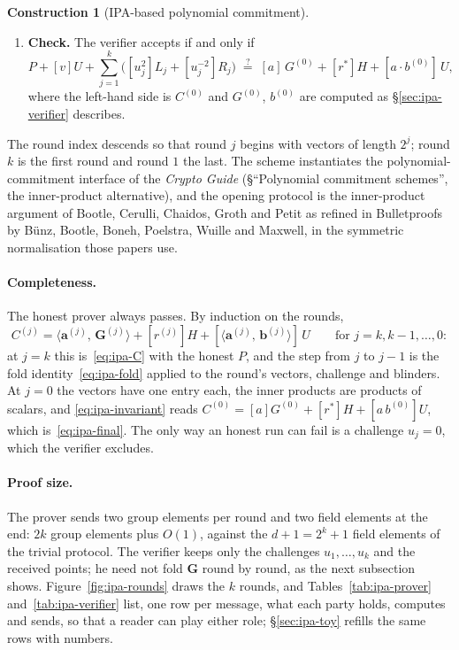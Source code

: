 \documentclass[11pt,a4paper]{article}
\theoremstyle{definition}
\newtheorem{construction}[theorem]{Construction}
\newcommand{\ip}[2]{\langle #1,\, #2 \rangle}
\begin{document}
\begin{construction}[IPA-based polynomial commitment]
\begin{enumerate}[leftmargin=*, itemsep=2pt]
  the scalar $a$ and the aggregated blinder
  \[
  r^{*} := r^{(0)} = r + \sum_{j=1}^{k}
    \bigl(u_j^{2}\,\ell_j + u_j^{-2}\rho_j\bigr) .
  \]
\item \textbf{Check.} The verifier accepts if and only if
  \begin{equation}\label{eq:ipa-final}
  P + [v]U + \sum_{j=1}^{k}\bigl([u_j^{2}]L_j + [u_j^{-2}]R_j\bigr)
  \;\overset{?}{=}\;
  [a]\,G^{(0)} + [r^{*}]H + [a\cdot b^{(0)}]\,U ,
  \end{equation}
  where the left-hand side is $C^{(0)}$ and $G^{(0)}$, $b^{(0)}$ are
  computed as \S\ref{sec:ipa-verifier} describes.
\end{enumerate}
\end{construction}

The round index descends so that round $j$ begins with vectors of
length $2^{j}$; round $k$ is the first round and round $1$ the last.
The scheme instantiates the polynomial-commitment interface of the
\emph{Crypto Guide} (\S``Polynomial commitment schemes'', the
inner-product alternative), and the opening protocol is the
inner-product argument of Bootle, Cerulli, Chaidos, Groth and Petit as
refined in Bulletproofs by B\"unz, Bootle, Boneh, Poelstra, Wuille and
Maxwell, in the symmetric normalisation those papers use.

\paragraph{Completeness.}
The honest prover always passes. By induction on the rounds,
\begin{equation}\label{eq:ipa-invariant}
C^{(j)} = \ip{\mathbf a^{(j)}}{\mathbf G^{(j)}} + [r^{(j)}]H
  + [\ip{\mathbf a^{(j)}}{\mathbf b^{(j)}}]\,U
\qquad\text{for } j = k, k-1, \dots, 0 :
\end{equation}
at $j = k$ this is~\eqref{eq:ipa-C} with the honest $P$, and the step
from $j$ to $j - 1$ is the fold identity~\eqref{eq:ipa-fold} applied to
the round's vectors, challenge and blinders. At $j = 0$ the vectors have
one entry each, the inner products are products of scalars, and
\eqref{eq:ipa-invariant} reads $C^{(0)} = [a]G^{(0)} + [r^{*}]H +
[a\,b^{(0)}]U$, which is~\eqref{eq:ipa-final}. The only way an honest
run can fail is a challenge $u_j = 0$, which the verifier excludes.

\paragraph{Proof size.}
The prover sends two group elements per round and two field elements at
the end: $2k$ group elements plus $O(1)$, against the $d + 1 = 2^k + 1$
field elements of the trivial protocol. The verifier keeps only the
challenges $u_1, \dots, u_k$ and the received points; he need not fold
$\mathbf G$ round by round, as the next subsection shows.
Figure~\ref{fig:ipa-rounds} draws the $k$ rounds, and
Tables~\ref{tab:ipa-prover} and~\ref{tab:ipa-verifier} list, one row
per message, what each party holds, computes and sends, so that a reader
can play either role; \S\ref{sec:ipa-toy} refills the same rows with
numbers.
\end{document}
